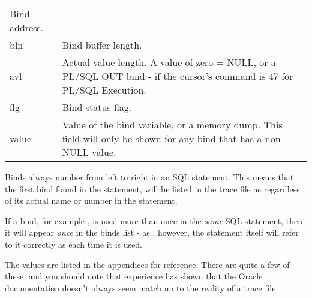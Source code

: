 \begin{longtable}[]{@{}l|l@{}}
\begin{minipage}[t]{0.65\columnwidth}
Bind address.\strut
\end{minipage}\tabularnewline
\begin{minipage}[t]{0.14\columnwidth}\raggedright\strut
bln\strut
\end{minipage} & \begin{minipage}[t]{0.65\columnwidth}\raggedright\strut
Bind buffer length.\strut
\end{minipage}\tabularnewline
\begin{minipage}[t]{0.14\columnwidth}\raggedright\strut
avl\strut
\end{minipage} & \begin{minipage}[t]{0.65\columnwidth}\raggedright\strut
Actual value length. A value of zero = NULL, or a PL/SQL OUT bind - if
the cursor's command is 47 for PL/SQL Execution.\strut
\end{minipage}\tabularnewline
\begin{minipage}[t]{0.14\columnwidth}\raggedright\strut
flg\strut
\end{minipage} & \begin{minipage}[t]{0.65\columnwidth}\raggedright\strut
Bind status flag.\strut
\end{minipage}\tabularnewline
\begin{minipage}[t]{0.14\columnwidth}\raggedright\strut
value\strut
\end{minipage} & \begin{minipage}[t]{0.65\columnwidth}\raggedright\strut
Value of the bind variable, or a memory dump. This field will only be
shown for any bind that has a non-NULL value.\strut
\end{minipage}\tabularnewline
\bottomrule
\end{longtable}

Binds always number from left to right in an SQL statement. This means that the first bind found in the statement, will be listed in the trace file as  regardless of its actual name or number in the statement.

If a bind, for example , is used more than once in the \emph{same} SQL statement, then it will appear \emph{once} in the binds list - as , however, the statement itself will refer to it correctly as  each time it is used.

The  values are listed in the appendices for reference. There are quite a few of these, and you should note that experience has shown that the Oracle documentation doesn't always seem match up to the reality of a trace file.

